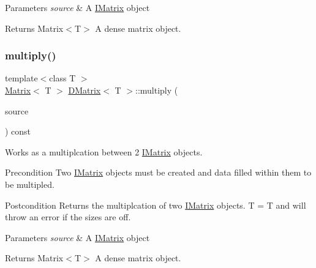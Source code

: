 \begin{DoxyParams}{Parameters}
{\em source} & A \mbox{\hyperlink{class_i_matrix}{I\+Matrix}} object \\
\hline
\end{DoxyParams}
\begin{DoxyReturn}{Returns}
Matrix$<$\+T$>$ A dense matrix object. 
\end{DoxyReturn}
\mbox{\label{class_d_matrix_ab2d385b9272369aa3e52aa6a9c55d9da}} 
\subsubsection{\texorpdfstring{multiply()}{multiply()}\hspace{0.1cm}{\footnotesize\ttfamily [3/6]}}
{\footnotesize\ttfamily template$<$class T $>$ \\
\mbox{\hyperlink{class_matrix}{Matrix}}$<$ T $>$ \mbox{\hyperlink{class_d_matrix}{D\+Matrix}}$<$ T $>$\+::multiply (\begin{DoxyParamCaption}\item[{const \mbox{\hyperlink{class_i_matrix}{I\+Matrix}}$<$ \mbox{\hyperlink{class_l_matrix}{L\+Matrix}}$<$ T $>$, T $>$ \&}]{source }\end{DoxyParamCaption}) const}



Works as a multiplcation between 2 \mbox{\hyperlink{class_i_matrix}{I\+Matrix}} objects. 

\begin{DoxyPrecond}{Precondition}
Two \mbox{\hyperlink{class_i_matrix}{I\+Matrix}} objects must be created and data filled within them to be multipled. 
\end{DoxyPrecond}
\begin{DoxyPostcond}{Postcondition}
Returns the multiplcation of two \mbox{\hyperlink{class_i_matrix}{I\+Matrix}} objects. T = T and will throw an error if the sizes are off.
\end{DoxyPostcond}

\begin{DoxyParams}{Parameters}
{\em source} & A \mbox{\hyperlink{class_i_matrix}{I\+Matrix}} object \\
\hline
\end{DoxyParams}
\begin{DoxyReturn}{Returns}
Matrix$<$\+T$>$ A dense matrix object. 
\end{DoxyReturn}
\mbox{\label{class_d_matrix_aca6d817192a416c42f76790ac49cfa0a}} 
